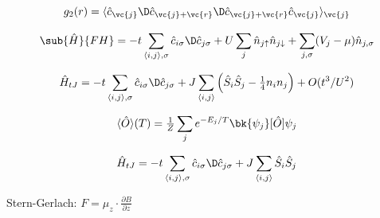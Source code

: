  \begin{equation*}
 	g_2(r) = \langle \hat{c}_{\vc{j}}\D \hat{c}_{\vc{j}+\vc{r}}\D \hat{c}_{\vc{j}+\vc{r}}\hat{c}_{\vc{j}}\rangle_{\vc{j}}
 \end{equation*}

 \begin{equation*}
 	\sub{\hat{H}}{FH} = - t \sum_{\langle i,j\rangle, \sigma} \hat{c}_{i \sigma}\D \hat{c}_{j \sigma} + U \sum_j \hat{n}_{j \uparrow} \hat{n}_{j \downarrow} + \sum_{j, \sigma} (V_j - \mu)\hat{n}_{j, \sigma}
 \end{equation*}

 \begin{equation*}
 	{\hat{H}}_{tJ} = - t \sum_{\langle i,j\rangle, \sigma} \hat{c}_{i \sigma}\D \hat{c}_{j \sigma} + J \sum_{\langle i,j\rangle}\left(
 		\hat{S}_i \hat{S}_j - \tfrac{1}{4} n_i n_j
 	\right) + O(t^3 / U^2)
 \end{equation*}

 \begin{equation*}
 	\langle \hat{O}\rangle(T) = \tfrac{1}{Z}\sum_j e^{- E_j / T} \bk{\psi_j}[\hat{O}]{\psi_j}
 \end{equation*}

\begin{equation*}
{\hat{H}}_{tJ} = - t \sum_{\langle i,j\rangle, \sigma} \hat{c}_{i \sigma}\D \hat{c}_{j \sigma} + J \sum_{\langle i,j\rangle}
	\hat{S}_i \hat{S}_j
\end{equation*}

Stern-Gerlach: $F = \mu_z  \cdot \tfrac{\partial B}{\partial z} $

